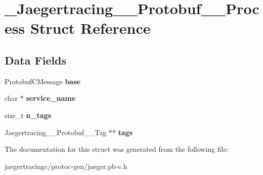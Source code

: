 \hypertarget{struct__Jaegertracing____Protobuf____Process}{}\section{\+\_\+\+Jaegertracing\+\_\+\+\_\+\+Protobuf\+\_\+\+\_\+\+Process Struct Reference}
\label{struct__Jaegertracing____Protobuf____Process}
\subsection*{Data Fields}
\begin{DoxyCompactItemize}
\item 
\mbox{\label{struct__Jaegertracing____Protobuf____Process_ae8195593faa6c882368973fe424804ec}} 
Protobuf\+C\+Message {\bfseries base}
\item 
\mbox{\label{struct__Jaegertracing____Protobuf____Process_a76cc3d4c5e0de7a533b201a4bc23bc09}} 
char $\ast$ {\bfseries service\+\_\+name}
\item 
\mbox{\label{struct__Jaegertracing____Protobuf____Process_a3c1cefa717abb1be371a45d87e2dd91d}} 
size\+\_\+t {\bfseries n\+\_\+tags}
\item 
\mbox{\label{struct__Jaegertracing____Protobuf____Process_a4ee1a205145e6abe6b0b36381c0ef650}} 
Jaegertracing\+\_\+\+\_\+\+Protobuf\+\_\+\+\_\+\+Tag $\ast$$\ast$ {\bfseries tags}
\end{DoxyCompactItemize}


The documentation for this struct was generated from the following file\+:\begin{DoxyCompactItemize}
\item 
jaegertracingc/protoc-\/gen/jaeger.\+pb-\/c.\+h\end{DoxyCompactItemize}
